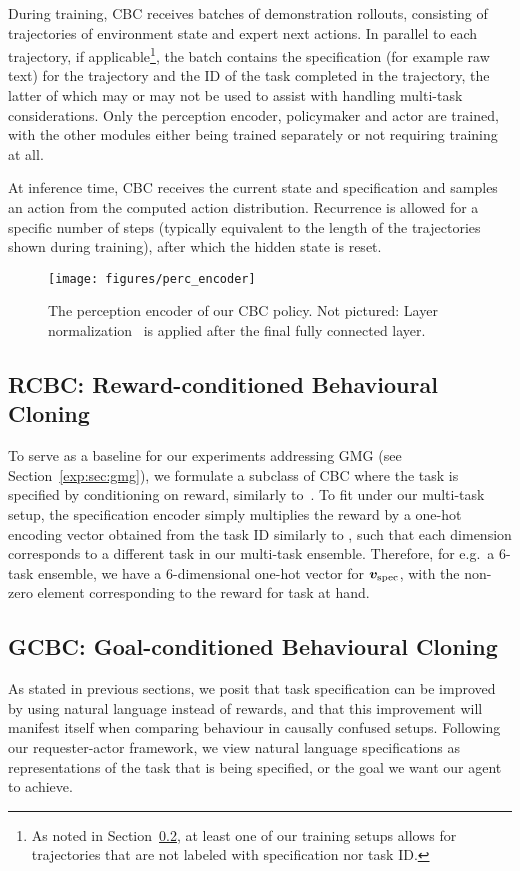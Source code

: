 \documentclass[../main.tex]{subfiles}
\begin{document}
During training, CBC receives batches of demonstration rollouts,
consisting of trajectories of environment state and expert next actions. In parallel to each
trajectory, if applicable\footnote{As noted in Section~\ref{meth:sec:gcbc}, at least one of our training
	setups allows for trajectories that are not labeled with specification nor task ID.}, the batch
contains the specification (for example raw text) for the trajectory and the ID of the task
completed in the trajectory, the latter of which may or may not be used to assist with handling multi-task considerations. Only the perception encoder, policymaker and actor are trained, with
the other modules either being trained separately or not requiring training at all.

At inference time, CBC receives the current state and specification and samples an action from the
computed action distribution. Recurrence is allowed for a specific number of steps (typically
equivalent to the length of the trajectories shown during training), after which the hidden state is
reset.

\begin{figure}[t]
	\centering
	\texttt{[image: figures/perc\_encoder]}
	\caption[The perception encoder of our CBC policy.]{The perception encoder of our CBC policy. Not
		pictured: Layer normalization~\citep{ba_layer_2016} is applied after the final fully connected layer.}
	\label{fig:perc-enc}
\end{figure}

\subsection{RCBC: Reward-conditioned Behavioural Cloning}\label{meth:sec:rcbc}
To serve as a baseline for our experiments addressing GMG (see Section~\ref{exp:sec:gmg}), we
formulate a subclass of CBC where the task is specified by conditioning on reward, similarly to~\citep{chen_decision_2021}. To fit under our multi-task setup, the specification encoder simply
multiplies the reward by a one-hot encoding vector obtained from the task ID similarly to \citet{cho_multi-task_2022}, such that each
dimension corresponds to a different task in our multi-task ensemble. Therefore, for e.g.\ a 6-task
ensemble, we have a 6-dimensional one-hot vector for $\bm v_\text{spec}$, with the non-zero
element corresponding to the reward for task at hand.

\subsection{GCBC: Goal-conditioned Behavioural Cloning}\label{meth:sec:gcbc}
As stated in previous sections, we posit that task specification can be improved by using natural
language instead of rewards, and that this improvement will manifest itself when comparing behaviour
in causally confused setups. Following our requester-actor framework, we view natural language
specifications as representations of the task that is being specified, or the goal we want our agent
to achieve.
\end{document}
